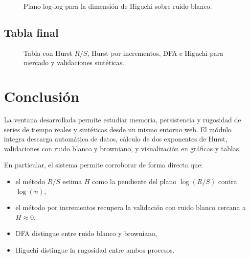 \documentclass[12pt,a4paper]{article}
\begin{document}
\begin{figure}[H]
    \centering
    \fbox{\rule{0pt}{7cm}\rule{0.9\linewidth}{0pt}}
    \caption{Plano log-log para la dimensión de Higuchi sobre ruido blanco.}
\end{figure}

\subsection{Tabla final}

\begin{figure}[H]
    \centering
    \fbox{\rule{0pt}{6cm}\rule{0.9\linewidth}{0pt}}
    \caption{Tabla con Hurst \(R/S\), Hurst por incrementos, DFA e Higuchi para mercado y validaciones sintéticas.}
\end{figure}

\section{Conclusión}

La ventana desarrollada permite estudiar memoria, persistencia y rugosidad de series de tiempo reales y sintéticas desde un mismo entorno web. El módulo integra descarga automática de datos, cálculo de dos exponentes de Hurst, validaciones con ruido blanco y browniano, y visualización en gráficas y tablas.

En particular, el sistema permite corroborar de forma directa que:

\begin{itemize}
    \item el método \(R/S\) estima \(H\) como la pendiente del plano \(\log(R/S)\) contra \(\log(n)\),
    \item el método por incrementos recupera la validación con ruido blanco cercana a \(H \approx 0\),
    \item DFA distingue entre ruido blanco y browniano,
    \item Higuchi distingue la rugosidad entre ambos procesos.
\end{itemize}
\end{document}
